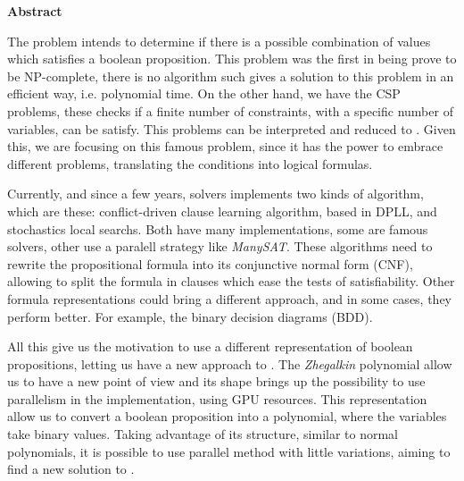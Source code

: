 \cleardoublepage
{}
{}
\thispagestyle{pagebottom}
\noindent\textbf{\Huge Abstract}

\vspace{2em}

The \sat problem intends to determine if there is a possible combination of values which satisfies a boolean proposition. This problem was the first in being prove to be NP-complete, there is no algorithm such gives a solution to this problem in an efficient way, i.e. polynomial time. On the other hand, we have the CSP problems, these checks if a finite number of constraints, with a specific number of variables, can be satisfy. This problems can be interpreted and reduced to \sat. Given this, we are focusing on this famous problem, since it has the power to embrace different problems, translating the conditions into logical formulas.

Currently, and since a few years, \sat solvers implements two kinds of algorithm, which are these: conflict-driven clause learning algorithm, based in DPLL, and stochastics local searchs. Both have many implementations, some are famous \sat solvers, other use a paralell strategy like \textit{ManySAT}. These algorithms need to rewrite the propositional formula into its conjunctive normal form (CNF), allowing to split the formula in clauses which ease the tests of satisfiability. Other formula representations could bring a different approach, and in some cases, they perform better. For example, the binary decision diagrams (BDD).

All this give us the motivation to use a different representation of boolean propositions, letting us have a new approach to \sat. The \textit{Zhegalkin} polynomial allow us to have a new point of view and its shape brings up the possibility to use parallelism in the implementation, using GPU resources. This representation allow us to convert a boolean proposition into a polynomial, where the variables take binary values. Taking advantage of its structure, similar to normal polynomials, it is possible to use parallel method with little variations, aiming to find a new solution to \sat.

\newpage